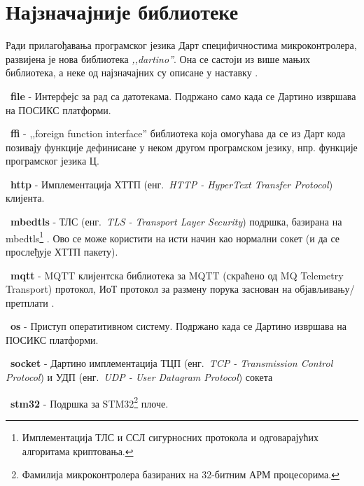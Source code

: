 \documentclass[12pt,oneside]{memoir}
\begin{document}
\section{Најзначајније библиотеке}
\label{biblioteke}
Ради прилагођавања програмског језика Дарт специфичностима микроконтролера, развијена је нова библиотека \textit{,,dartino''}. Она се састоји из више мањих библиотека, а неке од најзначајних су описане у наставку  \cite{biblioteke}.

\begin{description}

\item ~\textbf{file} - Интерфејс за рад са датотекама. Подржано само када се Дартино извршава на ПОСИКС платформи.

\item ~\textbf{ffi} - ,,foreign function interface'' библиотека која омогућава да се из Дарт кода позивају функције дефинисане у неком другом програмском језику, нпр. функције програмског језика Ц.

\item ~\textbf{http} - Имплементација ХТТП (енг.~\textit{HTTP - HyperText Transfer Protocol}) клијента.

\item ~\textbf{mbedtls} - ТЛС (енг.~\textit{TLS - Transport Layer Security}) подршка, базирана на mbedtls\footnote{ Имплементација ТЛС и ССЛ сигурносних протокола и одговарајућих алгоритама криптовања.} \cite{mbed}.
Ово се може користити на исти начин као нормални сокет (и да се прослеђује ХТТП пакету).

\item ~\textbf{mqtt} - MQTT клијентска библиотека за MQTT (скраћено од MQ Telemetry Transport) протокол, ИоТ протокол за размену порука заснован на објављивању/претплати \cite{mqtt}.

\item ~\textbf{os} - Приступ оператитивном систему. Подржано када се Дартино извршава на ПОСИКС платформи.

\item ~\textbf{socket} - Дартино имплементација ТЦП (енг.~\textit{TCP - Transmission Control Protocol}) и УДП (енг.~\textit{UDP - User Datagram Protocol}) сокета

\item ~\textbf{stm32} - Подршка за STM32\footnote{Фамилија микроконтролера базираних на 32-битним АРМ процесорима.} плоче.

\end{description}
\end{document}
